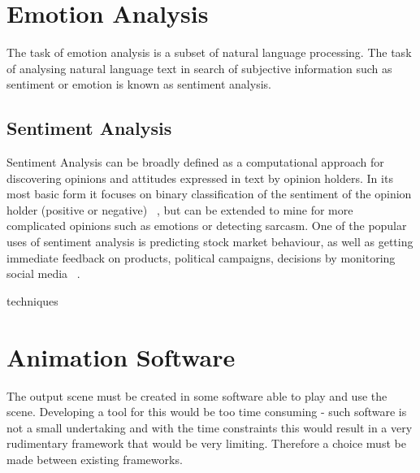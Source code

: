 

\section{Emotion Analysis}

The task of emotion analysis is a subset of natural language processing. The task of analysing natural language text in search of subjective information such as sentiment or emotion is known as sentiment analysis.

\subsection{Sentiment Analysis}
Sentiment Analysis can be broadly defined as a computational approach for discovering opinions and attitudes expressed in text by opinion holders. In its most basic form it focuses on binary classification of the sentiment of the opinion holder (positive or negative) ~\cite{sentimentanal1}, but can be extended to mine for more complicated opinions such as emotions or detecting sarcasm. One of the popular uses of sentiment analysis is predicting stock market behaviour, as well as getting immediate feedback on products, political campaigns, decisions by monitoring social media ~\cite{sentimentanal2}.





techniques ~\cite{sentimentanal2}





\section{Animation Software}

The output scene must be created in some software able to play and use the scene. Developing a tool for this would be too time consuming - such software is not a small undertaking and with the time constraints this would result in a very rudimentary framework that would be very limiting. Therefore a choice must be made between existing frameworks.

